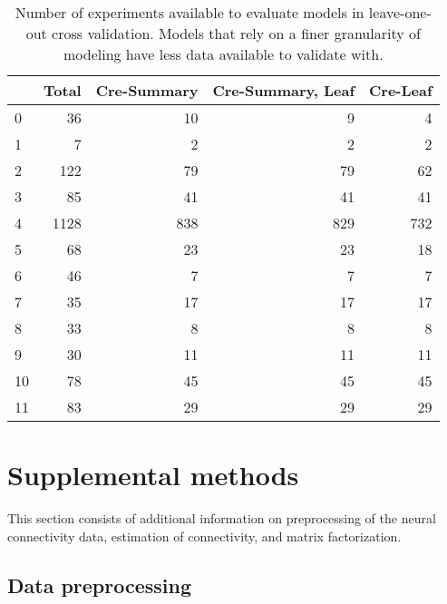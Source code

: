 \begin{table}[H]
\begin{tabular}{lrrrr}
\toprule
{} &  Total &  Cre-Summary &  Cre-Summary, Leaf &  Cre-Leaf \\
\midrule
0  &     36 &           10 &                  9 &         4 \\
1  &      7 &            2 &                  2 &         2 \\
2  &    122 &           79 &                 79 &        62 \\
3  &     85 &           41 &                 41 &        41 \\
4  &   1128 &          838 &                829 &       732 \\
5  &     68 &           23 &                 23 &        18 \\
6  &     46 &            7 &                  7 &         7 \\
7  &     35 &           17 &                 17 &        17 \\
8  &     33 &            8 &                  8 &         8 \\
9  &     30 &           11 &                 11 &        11 \\
10 &     78 &           45 &                 45 &        45 \\
11 &     83 &           29 &                 29 &        29 \\
\bottomrule
\end{tabular}
\caption{Number of experiments available to evaluate models in leave-one-out cross validation. 
Models that rely on a finer granularity of modeling have less data available to validate with.}  
\end{table}

\newpage 
\section{Supplemental methods}
\label{sec:supp_methods}

This section consists of additional information on preprocessing of the neural connectivity data, estimation of connectivity, and matrix factorization.

\subsection{Data preprocessing}
\label{sec:dp}


